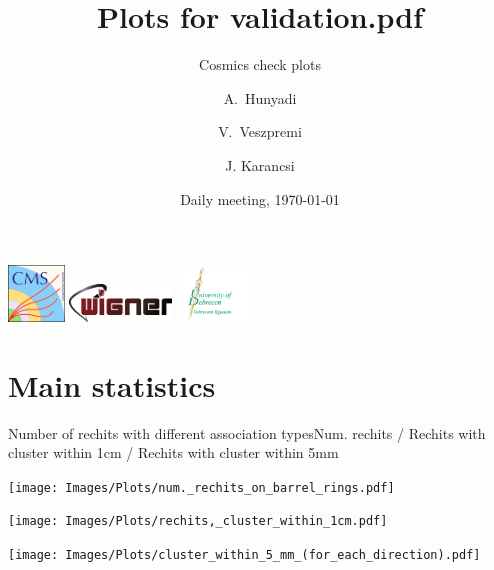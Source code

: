 \documentclass{beamer}
\title{Plots for validation.pdf}
\subtitle{Cosmics check plots}
\author{A.~Hunyadi\inst{1,2} \and V.~Veszpremi\inst{1} \and J. Karancsi\inst{2}}
\institute[] %
{
  \inst{1}%
  Wigner Research Centre for Physics, Budapest
  \and
  \inst{2}%
  University of Debrecen, Debrecen
}
\date{Daily meeting, \today}
\begin{document}
\begin{frame}
  \vspace*{-0.3cm}
  \titlepage
  \vspace*{-0.5cm}
  \begin{center}
  \includegraphics[height=1.5cm]{Images/cms_logo.png}\hspace*{0.3cm}
  \includegraphics[height=1.0cm]{Images/wigner_logo.png}\hspace*{0.4cm}
  \includegraphics[height=1.5cm]{Images/egyetem_logo.png}
  \end{center}
\end{frame}


\section{Main statistics}

\begin{frame}{Number of rechits with different association types}{Num. rechits / Rechits with cluster within 1cm / Rechits with cluster within 5mm}
  \begin{minipage}{0.32\textwidth}
    \centering
    \texttt{[image: Images/Plots/num.\_rechits\_on\_barrel\_rings.pdf]}
  \end{minipage}%
  \hspace{0.01\textwidth}%
  \begin{minipage}{0.32\textwidth}
    \centering
    \texttt{[image: Images/Plots/rechits,\_cluster\_within\_1cm.pdf]}
  \end{minipage}%
  \hspace{0.01\textwidth}%
  \begin{minipage}{0.32\textwidth}
    \centering
    \texttt{[image: Images/Plots/cluster\_within\_5\_mm\_(for\_each\_direction).pdf]}
  \end{minipage}
\end{frame}
\end{document}

